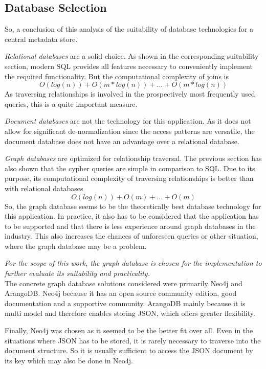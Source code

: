 \subsection{Database Selection}
So, a conclusion of this analysis of the suitability of database technologies for a central metadata store.\par 
\emph{Relational databases} are a solid choice. As shown in the corresponding suitability section, modern SQL provides all features necessary to conveniently implement the required functionality. But the computational complexity of joins is 
$$O(log(n)) + O(m*log(n)) + ... + O(m*log(n))$$
As traversing relationships is involved in the prospectively most frequently used queries, this is a quite important measure.\par 
\emph{Document databases} are not the technology for this application. As it does not allow for significant de-normalization since the access patterns are versatile, the document database does not have an advantage over a relational database.\par 
\emph{Graph databases} are optimized for relationship traversal. The previous section has also shown that the cypher queries are simple in comparison to SQL. Due to its purpose, its computational complexity of traversing relationships is better than with relational databases
$$O(log(n)) + O(m) + ... + O(m)$$
So, the graph database seems to be the theoretically best database technology for this application. In practice, it also has to be considered that the application has to be supported and that there is less experience around graph databases in the industry. This also increases the chances of unforeseen queries or other situation, where the graph database may be a problem.\par 
\emph{For the scope of this work, the graph database is chosen for the implementation to further evaluate its suitability and practicality.}\\

The concrete graph database solutions considered were primarily Neo4j and ArangoDB. Neo4j because it has an open source community edition, good documentation and a supportive community. ArangoDB mainly because it is multi model and therefore enables storing JSON, which offers greater flexibility.\par 
Finally, Neo4j was chosen as it seemed to be the better fit over all. Even in the situations where JSON has to be stored, it is rarely necessary to traverse into the document structure. So it is usually sufficient to access the JSON document by its key which may also be done in Neo4j.

